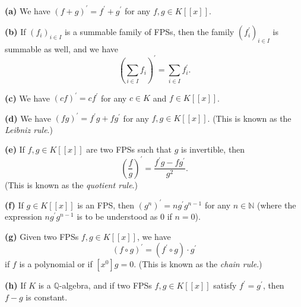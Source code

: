 \begin{theorem}
\label{thm.fps.deriv.rules}
\leantarget
\leanok

\textbf{(a)} We have $\left(  f+g\right)  ^{\prime
}=f^{\prime}+g^{\prime}$ for any $f,g\in K\left[  \left[  x\right]  \right]
$. \medskip

\textbf{(b)} If $\left(  f_{i}\right)  _{i\in I}$ is a summable family of
FPSs, then the family $\left(  f_{i}^{\prime}\right)  _{i\in I}$ is summable
as well, and we have%
\[
\left(  \sum_{i\in I}f_{i}\right)  ^{\prime}=\sum_{i\in I}f_{i}^{\prime}.
\]


\textbf{(c)} We have $\left(  cf\right)  ^{\prime}=cf^{\prime}$ for any $c\in
K$ and $f\in K\left[  \left[  x\right]  \right]  $. \medskip

\textbf{(d)} We have $\left(  fg\right)  ^{\prime}=f^{\prime}g+fg^{\prime}$
for any $f,g\in K\left[  \left[  x\right]  \right]  $. (This is known as the
\emph{Leibniz rule}.) \medskip

\textbf{(e)} If $f,g\in K\left[  \left[  x\right]  \right]  $ are two FPSs
such that $g$ is invertible, then%
\[
\left(  \dfrac{f}{g}\right)  ^{\prime}=\dfrac{f^{\prime}g-fg^{\prime}}{g^{2}%
}.
\]
(This is known as the \emph{quotient rule}.) \medskip

\textbf{(f)} If $g\in K\left[  \left[  x\right]  \right]  $ is an FPS, then
$\left(  g^{n}\right)  ^{\prime}=ng^{\prime}g^{n-1}$ for any $n\in\mathbb{N}$
(where the expression $ng^{\prime}g^{n-1}$ is to be understood as $0$ if
$n=0$). \medskip

\textbf{(g)} Given two FPSs $f,g\in K\left[  \left[  x\right]  \right]  $, we
have
\[
\left(  f\circ g\right)  ^{\prime}=\left(  f^{\prime}\circ g\right)  \cdot
g^{\prime}%
\]
if $f$ is a polynomial or if $\left[  x^{0}\right]  g=0$. (This is known as
the \emph{chain rule}.) \medskip

\textbf{(h)} If $K$ is a $\mathbb{Q}$-algebra, and if two FPSs $f,g\in
K\left[  \left[  x\right]  \right]  $ satisfy $f^{\prime}=g^{\prime}$, then
$f-g$ is constant.
\end{theorem}

